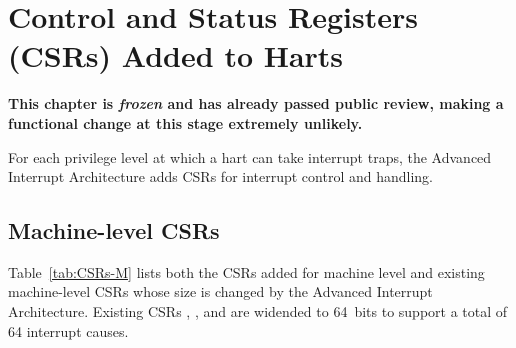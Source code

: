 
\chapter{Control and Status Registers (CSRs) Added to Harts}
\label{ch:CSRs}

\textbf{%
This chapter is \emph{frozen} and has already passed public review,
making a functional change at this stage extremely unlikely.%
}
\bigskip

For each privilege level at which a {\RISCV} hart can take interrupt
traps, the Advanced Interrupt Architecture adds CSRs for interrupt
control and handling.

\section{Machine-level CSRs}

Table~\ref{tab:CSRs-M} lists both the CSRs added for machine level
and existing machine-level CSRs whose size is changed
by the Advanced Interrupt Architecture.
Existing CSRs , , and  are
widended to 64~bits to support a total of 64 interrupt causes.


